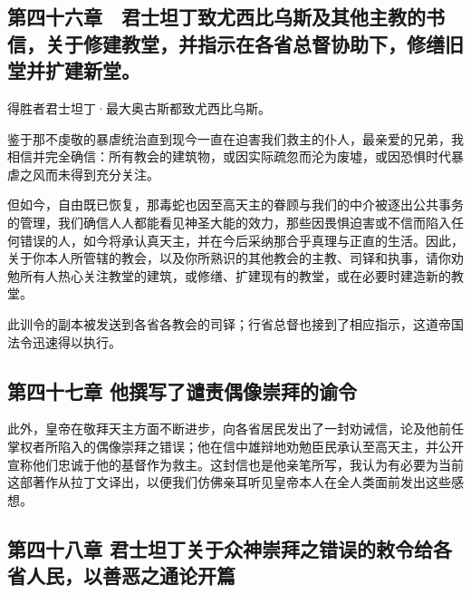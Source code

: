 
\subsection{第四十六章　君士坦丁致尤西比乌斯及其他主教的书信，关于修建教堂，并指示在各省总督协助下，修缮旧堂并扩建新堂。}

得胜者君士坦丁·最大奥古斯都致尤西比乌斯。\par

鉴于那不虔敬的暴虐统治直到现今一直在迫害我们救主的仆人，最亲爱的兄弟，我相信并完全确信：所有教会的建筑物，或因实际疏忽而沦为废墟，或因恐惧时代暴虐之风而未得到充分关注。\par

但如今，自由既已恢复，那毒蛇也因至高天主的眷顾与我们的中介被逐出公共事务的管理，我们确信人人都能看见神圣大能的效力，那些因畏惧迫害或不信而陷入任何错误的人，如今将承认真天主，并在今后采纳那合乎真理与正直的生活。因此，关于你本人所管辖的教会，以及你所熟识的其他教会的主教、司铎和执事，请你劝勉所有人热心关注教堂的建筑，或修缮、扩建现有的教堂，或在必要时建造新的教堂。\par

此训令的副本被发送到各省各教会的司铎；行省总督也接到了相应指示，这道帝国法令迅速得以执行。\par


\subsection{第四十七章 他撰写了谴责偶像崇拜的谕令}

此外，皇帝在敬拜天主方面不断进步，向各省居民发出了一封劝诫信，论及他前任掌权者所陷入的偶像崇拜之错误；他在信中雄辩地劝勉臣民承认至高天主，并公开宣称他们忠诚于他的基督作为救主。这封信也是他亲笔所写，我认为有必要为当前这部著作从拉丁文译出，以便我们仿佛亲耳听见皇帝本人在全人类面前发出这些感想。\par


\subsection{第四十八章 君士坦丁关于众神崇拜之错误的敕令给各省人民，以善恶之通论开篇}


